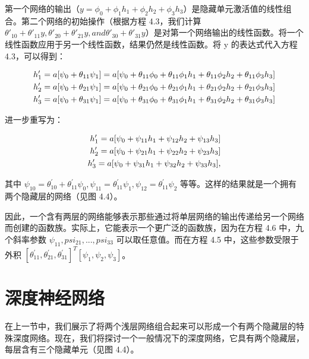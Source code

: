 第一个网络的输出（\(y = \phi_0 + \phi_1h_1 + \phi_2h_2 + \phi_3h_3\)）是隐藏单元激活值的线性组合。第二个网络的初始操作（根据方程 4.3，我们计算 \(\theta'_{10}+\theta'_{11}y, \theta'_{20}+\theta'_{21}y, and \theta'_{30}+\theta'_{31}y\)）是对第一个网络输出的线性函数。将一个线性函数应用于另一个线性函数，结果仍然是线性函数。将 y 的表达式代入方程 4.3，可以得到：


\begin{align}
	h'_1 = a[\psi_0 + \theta_{11} \psi_1] = a[\psi_0 + \theta_{11} \phi_0 + \theta_{11} \phi_1 h_1 + \theta_{11} \phi_2 h_2 + \theta_{11} \phi_3 h_3] \notag \\
	h'_2 = a[\psi_0 + \theta_{21} \psi_1] = a[\psi_0 + \theta_{21} \phi_0 + \theta_{21} \phi_1 h_1 + \theta_{21} \phi_2 h_2 + \theta_{21} \phi_3 h_3] \notag \\
	h'_3 = a[\psi_0 + \theta_{31} \psi_1] = a[\psi_0 + \theta_{31} \phi_0 + \theta_{31} \phi_1 h_1 + \theta_{31} \phi_2 h_2 + \theta_{31} \phi_3 h_3] 
\end{align} 


进一步重写为：


\begin{align}
	h'_1 = a[\psi_0 + \psi_{11} h_1 + \psi_{12} h_2 + \psi_{13} h_3] \notag \\
	h'_2 = a[\psi_0 + \psi_{21} h_1 + \psi_{22} h_2 + \psi_{23} h_3] \notag \\
	h'_3 = a[\psi_0 + \psi_{31} h_1 + \psi_{32} h_2 + \psi_{33} h_3], 
\end{align} 


其中 \(\psi_{10} = \theta^\prime_{10} + \theta^\prime_{11} \psi_0, \psi_{11} = \theta^\prime_{11}\psi_1 , \psi_{12} = \theta^\prime_{11}\psi_2\) 等等。这样的结果就是一个拥有两个隐藏层的网络（见图 4.4）。

因此，一个含有两层的网络能够表示那些通过将单层网络的输出传递给另一个网络而创建的函数族。实际上，它能表示一个更广泛的函数族，因为在方程 4.6 中，九个斜率参数 \(\psi_{11}, psi_{21}, ..., psi_{33}\) 可以取任意值。而在方程 4.5 中，这些参数受限于外积 \([\theta^\prime_{11},\theta^\prime_{21},\theta^\prime_{31}]^T[\psi_1, \psi_2, \psi_3]\)。

\section{深度神经网络}
在上一节中，我们展示了将两个浅层网络组合起来可以形成一个有两个隐藏层的特殊深度网络。现在，我们将探讨一个一般情况下的深度网络，它具有两个隐藏层，每层含有三个隐藏单元（见图 4.4）。


